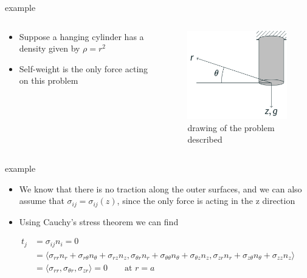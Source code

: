 \documentclass[
  letterpaper,
  ignorenonframetext,
  aspectratio=43,
  handout,
  12pt]{beamer}
\providecommand{\tightlist}{%
  \setlength{\itemsep}{0pt}\setlength{\parskip}{0pt}}
\providecommand{\tightlist}{%
\setlength{\itemsep}{0pt}\setlength{\parskip}{0pt}}
\let\Oldincludegraphics\includegraphics
\renewcommand{\includegraphics}[2][]{\Oldincludegraphics[width=\textwidth,height=0.7\textheight,keepaspectratio]{#2}}
\begin{document}
\begin{frame}{example}
\protect\hypertarget{example}{}
\begin{columns}[T]
\begin{column}{0.5\textwidth}
\begin{itemize}
\tightlist
\item
  Suppose a hanging cylinder has a density given by \(\rho = r^2\)
\item
  Self-weight is the only force acting on this problem
\end{itemize}
\end{column}

\begin{column}{0.5\textwidth}
\begin{figure}
\centering
\includegraphics{../images/11-example.svg}
\caption{drawing of the problem described}
\end{figure}
\end{column}
\end{columns}
\end{frame}

\begin{frame}{example}
\protect\hypertarget{example-1}{}
\begin{itemize}
\item
  We know that there is no traction along the outer surfaces, and we can
  also assume that \(\sigma_{ij} = \sigma_{ij}(z)\), since the only
  force is acting in the z direction
\item
  Using Cauchy's stress theorem we can find
\end{itemize}

\[\begin{aligned}
    t_j &= \sigma_{ij} n_i = 0\\
    &= \langle \sigma_{rr}n_r + \sigma_{r\theta} n_\theta + \sigma_{rz} n_z, \sigma_{\theta r}n_r + \sigma_{\theta \theta} n_\theta + \sigma_{\theta z} n_z, \sigma_{zr}n_r + \sigma_{z\theta} n_\theta + \sigma_{zz} n_z\rangle \\
    &= \langle \sigma_{rr}, \sigma_{\theta r}, \sigma_{z r} \rangle = 0 \qquad \text{at } r=a
\end{aligned}\]
\end{frame}
\end{document}
